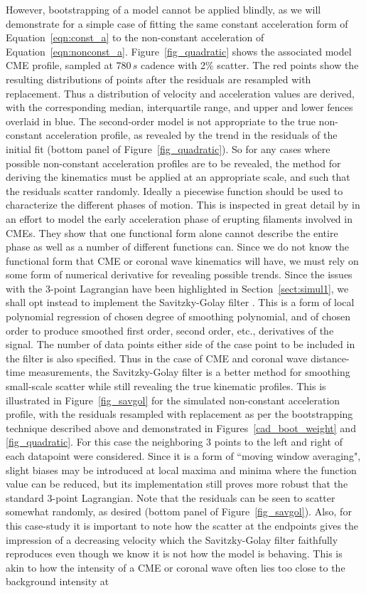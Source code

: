 \documentclass[structabstract]{aa}
\begin{document}
However, bootstrapping of a model cannot be applied blindly, as we will demonstrate for a simple case of fitting the same constant acceleration form of Equation~\ref{eqn:const_a} to the non-constant acceleration of Equation~\ref{eqn:nonconst_a}. Figure~\ref{fig_quadratic} shows the associated model CME profile, sampled at 780$\,s$ cadence with 2\% scatter. The red points show the resulting distributions of points after the residuals are resampled with replacement. Thus a distribution of velocity and acceleration values are derived, with the corresponding median, interquartile range, and upper and lower fences overlaid in blue. The second-order model is not appropriate to the true non-constant acceleration profile, as revealed by the trend in the residuals of the initial fit (bottom panel of Figure~\ref{fig_quadratic}). So for any cases where possible non-constant acceleration profiles are to be revealed, the method for deriving the kinematics must be applied at an appropriate scale, and such that the residuals scatter randomly. Ideally a piecewise function should be used to characterize the different phases of motion. This is inspected in great detail by \citet{2008ApJ...674..586S} in an effort to model the early acceleration phase of erupting filaments involved in CMEs. They show that one functional form alone cannot describe the entire phase as well as a number of different functions can. Since we do not know the functional form that CME or coronal wave kinematics will have, we must rely on some form of numerical derivative for revealing possible trends. Since the issues with the 3-point Lagrangian have been highlighted in Section~\ref{sect:simul1}, we shall opt instead to implement the Savitzky-Golay filter \citep{Savitzky-Golay1964}. This is a form of local polynomial regression of chosen degree of smoothing polynomial, and of chosen order to produce smoothed first order, second order, etc., derivatives of the signal. The number of data points either side of the case point to be included in the filter is also specified. Thus in the case of CME and coronal wave distance-time measurements, the Savitzky-Golay filter is a better method for smoothing small-scale scatter while still revealing the true kinematic profiles. This is illustrated in Figure~\ref{fig_savgol} for the simulated non-constant acceleration profile, with the residuals resampled with replacement as per the bootstrapping technique described above and demonstrated in Figures~\ref{cad_boot_weight} and \ref{fig_quadratic}. For this case the neighboring 3 points to the left and right of each datapoint were considered. Since it is a form of ``moving window averaging", slight biases may be introduced at local maxima and minima where the function value can be reduced, but its implementation still proves more robust that the standard 3-point Lagrangian. Note that the residuals can be seen to scatter somewhat randomly, as desired (bottom panel of Figure~\ref{fig_savgol}). Also, for this case-study it is important to note how the scatter at the endpoints gives the impression of a decreasing velocity which the Savitzky-Golay filter faithfully reproduces even though we know it is not how the model is behaving. This is akin to how the intensity of a CME or coronal wave often lies too close to the background intensity at 
\end{document}
